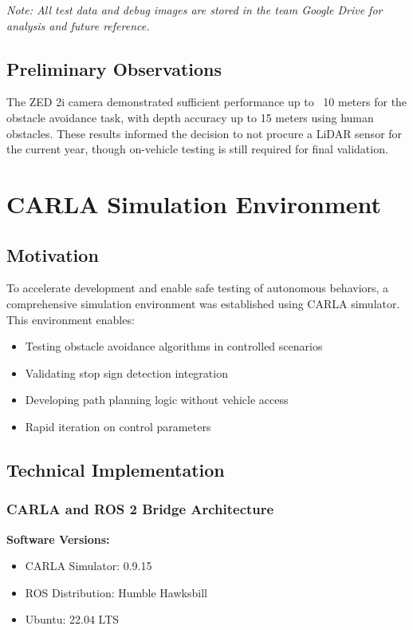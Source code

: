 \textit{Note: All test data and debug images are stored in the team Google Drive for analysis and future reference.}

\subsection{Preliminary Observations}
The ZED 2i camera demonstrated sufficient performance up to ~10 meters for the obstacle avoidance task, with depth accuracy up to 15 meters using human obstacles. These results informed the decision to not procure a LiDAR sensor for the current year, though on-vehicle testing is still required for final validation.

\section{CARLA Simulation Environment}

\subsection{Motivation}
To accelerate development and enable safe testing of autonomous behaviors, a comprehensive simulation environment was established using CARLA simulator. This environment enables:
\begin{itemize}
    \item Testing obstacle avoidance algorithms in controlled scenarios
    \item Validating stop sign detection integration
    \item Developing path planning logic without vehicle access
    \item Rapid iteration on control parameters
\end{itemize}

\subsection{Technical Implementation}

\subsubsection{CARLA and ROS 2 Bridge Architecture}
\textbf{Software Versions:}
\begin{itemize}
    \item CARLA Simulator: 0.9.15
    \item ROS Distribution: Humble Hawksbill
    \item Ubuntu: 22.04 LTS
\end{itemize}

